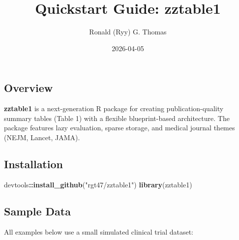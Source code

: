 \documentclass[
]{article}
\title{Quickstart Guide: zztable1}
\author{Ronald (Ryy) G. Thomas}
\date{2026-04-05}
\newenvironment{Shaded}{\begin{snugshade}}{\end{snugshade}}
\newcommand{\FunctionTok}[1]{\textcolor[rgb]{0.13,0.29,0.53}{\textbf{#1}}}
\newcommand{\NormalTok}[1]{#1}
\newcommand{\SpecialCharTok}[1]{\textcolor[rgb]{0.81,0.36,0.00}{\textbf{#1}}}
\newcommand{\StringTok}[1]{\textcolor[rgb]{0.31,0.60,0.02}{#1}}
\begin{document}
\maketitle

{
\setcounter{tocdepth}{2}
\tableofcontents
}
\subsection{Overview}\label{overview}

\textbf{zztable1} is a next-generation R package for creating
publication-quality summary tables (Table 1) with a flexible
blueprint-based architecture. The package features lazy evaluation,
sparse storage, and medical journal themes (NEJM, Lancet, JAMA).

\subsection{Installation}\label{installation}

\begin{Shaded}
\begin{Highlighting}[]
\NormalTok{devtools}\SpecialCharTok{::}\FunctionTok{install\_github}\NormalTok{(}\StringTok{"rgt47/zztable1"}\NormalTok{)}
\FunctionTok{library}\NormalTok{(zztable1)}
\end{Highlighting}
\end{Shaded}

\subsection{Sample Data}\label{sample-data}

All examples below use a small simulated clinical trial dataset:
\end{document}
